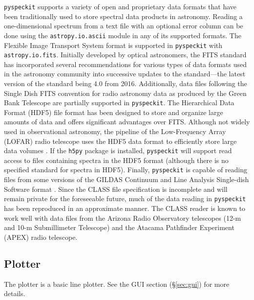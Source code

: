 \documentclass[twocolumn]{aastex61}
\newcommand{\pyspeckit}{\texttt{pyspeckit}\xspace}
\begin{document}
\pyspeckit{} supports a variety of open and proprietary data formats that have
been traditionally used to store spectral data products in astronomy.  Reading
a one-dimensional spectrum from a text file with an optional error column can
be done using the \texttt{astropy.io.ascii} module in any of its supported
formats.  The Flexible Image Transport System \citep[FITS;][]{Pence2010a} format is
supported in \pyspeckit{} with \texttt{astropy.io.fits}.  Initially developed
by optical astronomers, the FITS standard has incorporated several
recommendations for various types of data formats used in the astronomy
community into successive updates to the standard---the latest version of the
standard being 4.0 from 2016.  Additionally, data files following the Single
Dish FITS \citep[SDFITS;][]{Garwood2000a} convention for radio astronomy data as
produced by the Green Bank Telescope are partially supported in \pyspeckit.
The Hierarchical Data Format (HDF5) file format has been designed to store and
organize large amounts of data and offers significant advantages over FITS\@.
Although not widely used in observational astronomy, the pipeline of the
Low-Frequency Array (LOFAR) radio telescope uses the HDF5 data format to
efficiently store large data volumes \citep{Alexov2012a}.  If the \texttt{h5py}
package is installed, \pyspeckit{} will support read access to files containing
spectra in the HDF5 format (although there is no specified standard for spectra in
HDF5).  Finally, \pyspeckit{} is capable of reading files
from some versions of the GILDAS Continuum and Line Analysis Single-dish
Software format \citep[CLASS;][]{Gildas-Team2013a}.  Since the CLASS file specification
is incomplete and will remain private for the foreseeable future, much of the
data reading in \pyspeckit{} has been reproduced in an approximate manner.  The
CLASS reader is known to work well with data files from the Arizona Radio
Observatory telescopes (12-m and 10-m Submillimeter Telescope) and the Atacama
Pathfinder Experiment (APEX) radio telescope.

\subsection{Plotter}
The plotter is a basic line plotter.  See the GUI section (\S \ref{sec:gui})
for more details.

\end{document}
